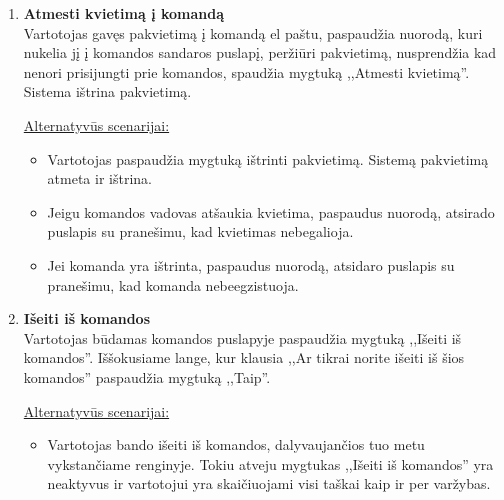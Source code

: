 \documentclass{VUMIFPSkursinis}
\begin{document}
\begin{enumerate} [label = \textbf{U\arabic*.}]
				\underline{Alternatyvūs scenarijai:}
				\begin{itemize}
					\item Vartotojas paspaudžia mygtuką ištrinti pakvietimą. Sistemą pakvietimą atmeta ir ištrina.
					\item Vartotojas nori sužinoti daugiau informacijos. Tada paspaudęs ant renginio pavadinimo yra nukeliamas į renginio puslapį, kur gali susirinkti daugiau informacijos.
					\item Jeigu komandos vadovas atšaukia kvietima, paspaudus nuorodą, atsirado puslapis su pranešimu, kad kvietimas nebegalioja.
					\item Jei komanda yra ištrinta, paspaudus nuorodą, atsidaro puslapis su pranešimu, kad komanda nebeegzistuoja.
				\end{itemize}

			\item \textbf{Atmesti kvietimą į komandą} \\
				Vartotojas gavęs pakvietimą į komandą el paštu, paspaudžia nuorodą, kuri nukelia jį į komandos sandaros puslapį, peržiūri pakvietimą, nusprendžia kad nenori prisijungti prie komandos, spaudžia mygtuką ,,Atmesti kvietimą''. Sistema ištrina pakvietimą.


				\underline{Alternatyvūs scenarijai:}
				\begin{itemize}
					\item Vartotojas paspaudžia mygtuką ištrinti pakvietimą. Sistemą pakvietimą atmeta ir ištrina.
					\item Jeigu komandos vadovas atšaukia kvietima, paspaudus nuorodą, atsirado puslapis su pranešimu, kad kvietimas nebegalioja.
					\item Jei komanda yra ištrinta, paspaudus nuorodą, atsidaro puslapis su pranešimu, kad komanda nebeegzistuoja.
				\end{itemize}
			
			\item \textbf{Išeiti iš komandos} \\
				Vartotojas būdamas komandos puslapyje paspaudžia mygtuką ,,Išeiti iš komandos''. Iššokusiame lange, kur klausia ,,Ar tikrai norite išeiti iš šios komandos'' paspaudžia mygtuką ,,Taip''.
				
				\underline{Alternatyvūs scenarijai:}
				\begin{itemize}
					\item Vartotojas bando išeiti iš komandos, dalyvaujančios tuo metu vykstančiame renginyje. Tokiu atveju mygtukas  ,,Išeiti iš komandos'' yra neaktyvus ir vartotojui yra skaičiuojami visi taškai kaip ir per varžybas.
				\end{itemize}


\end{enumerate}
\end{document}
